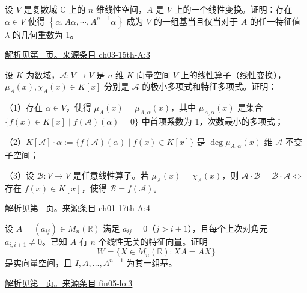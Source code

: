 \documentclass[12pt,fontset=fandol]{ctexart}
\begin{document}
\begin{example}\label{ex:ch03-15th-A:3}

设 $V$ 是复数域 $\mathbb{C}$ 上的 $n$ 维线性空间，$A$ 是 $V$ 上的一个线性变换。证明：存在 $\alpha \in V$ 使得 $\left\{\alpha, A\alpha, \cdots, A^{n-1}\alpha\right\}$ 成为 $V$ 的一组基当且仅当对于 $A$ 的任一特征值 $\lambda$ 的几何重数为 1。

\par\hyperref[ans:ch03-15th-A:3]{解析见第~\pageref{ans:ch03-15th-A:3} 页。}\quad\href{https://github.com/lzxcr/cmc-mathematics/blob/64916fa1fdbc3e444a652eca204d5669058ee321/src/problems/preliminary/15/03.md}{来源条目 ch03-15th-A:3}

\end{example}

\begin{example}\label{ex:ch01-17th-A:4}

设 $K$ 为数域，$\mathcal{A}: V \rightarrow V$ 是 $n$ 维 $K$-向量空间 $V$ 上的线性算子（线性变换），$\mu_A(x), \chi_A(x) \in K[x]$ 分别是 $\mathcal{A}$ 的极小多项式和特征多项式。证明：

（1）存在 $\alpha \in V$，使得 $\mu_A(x) = \mu_{A,\alpha}(x)$，其中 $\mu_{A,\alpha}(x)$ 是集合 $\{f(x) \in K[x] \mid f(\mathcal{A})(\alpha) = 0\}$ 中首项系数为 1，次数最小的多项式；

（2）$K[\mathcal{A}] \cdot \alpha := \{f(\mathcal{A})(\alpha) \mid f(x) \in K[x]\}$ 是 $\deg \mu_{A,\alpha}(x)$ 维 $\mathcal{A}$-不变子空间；

（3）设 $\mathcal{B}: V \rightarrow V$ 是任意线性算子。若 $\mu_A(x) = \chi_A(x)$，则 $\mathcal{A} \cdot \mathcal{B} = \mathcal{B} \cdot \mathcal{A} \Leftrightarrow$ 存在 $f(x) \in K[x]$，使得 $\mathcal{B} = f(\mathcal{A})$。

\par\hyperref[ans:ch01-17th-A:4]{解析见第~\pageref{ans:ch01-17th-A:4} 页。}\quad\href{https://github.com/lzxcr/cmc-mathematics/blob/64916fa1fdbc3e444a652eca204d5669058ee321/src/problems/preliminary/17/04.md}{来源条目 ch01-17th-A:4}

\end{example}

\begin{example}\label{ex:fin05-lo:3}

设 $A=(a_{ij})\in M_n(\mathbb R)$ 满足 $a_{ij}=0$（$j>i+1$），且每个上次对角元 $a_{i,i+1}\ne0$。已知 $A$ 有 $n$ 个线性无关的特征向量。证明
\[
W=\{X\in M_n(\mathbb R):XA=AX\}
\]
是实向量空间，且 $I,A,\ldots,A^{n-1}$ 为其一组基。

\par\hyperref[ans:fin05-lo:3]{解析见第~\pageref{ans:fin05-lo:3} 页。}\quad\href{https://github.com/lzxcr/cmc-mathematics/blob/64916fa1fdbc3e444a652eca204d5669058ee321/src/problems/finals/05/06.md}{来源条目 fin05-lo:3}

\end{example}
\end{document}
